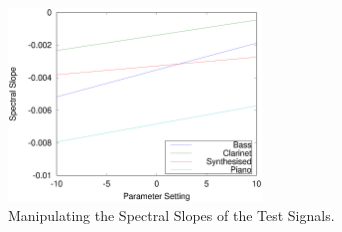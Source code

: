 		\begin{figure}[h!]
			\centering
			\includegraphics[width=0.6\textwidth]{chapter6/Images/MoveSlopes.eps}
			\caption{Manipulating the Spectral Slopes of the Test Signals.}
			\label{fig:MoveSlopes}
		\end{figure}

